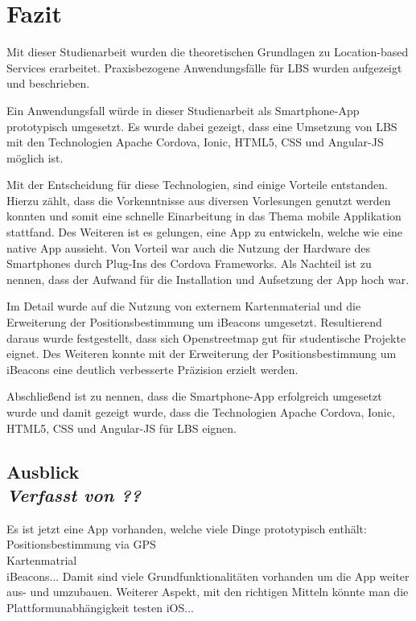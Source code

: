 \newpage
\section{Fazit}


Mit dieser Studienarbeit wurden die theoretischen Grundlagen zu Location-based Services erarbeitet. 
Praxisbezogene Anwendungsfälle für LBS wurden aufgezeigt und beschrieben.

Ein Anwendungsfall würde in dieser Studienarbeit als Smartphone-App prototypisch umgesetzt. 
Es wurde dabei gezeigt, dass eine Umsetzung von LBS mit den Technologien Apache Cordova, Ionic, HTML5, CSS und Angular-JS möglich ist. 

Mit der Entscheidung für diese Technologien, sind einige Vorteile entstanden. Hierzu zählt, dass die Vorkenntnisse aus diversen Vorlesungen genutzt werden konnten und somit eine schnelle Einarbeitung in das Thema mobile Applikation stattfand. Des Weiteren ist es gelungen, eine App zu entwickeln, welche wie eine native App aussieht. Von Vorteil war auch die Nutzung der Hardware des Smartphones durch Plug-Ins des Cordova Frameworks. Als Nachteil ist zu nennen, dass der Aufwand für die Installation und Aufsetzung der App hoch war.

Im Detail wurde auf die Nutzung von externem Kartenmaterial und die Erweiterung der Positionsbestimmung um iBeacons umgesetzt.
Resultierend daraus wurde festgestellt, dass sich Openstreetmap gut für studentische Projekte eignet. Des Weiteren konnte mit der Erweiterung der Positionsbestimmung um iBeacons eine deutlich verbesserte Präzision erzielt werden. 

Abschließend ist zu nennen, dass die Smartphone-App erfolgreich umgesetzt wurde und damit gezeigt wurde, dass die Technologien Apache Cordova, Ionic, HTML5, CSS und Angular-JS für LBS eignen.


\subsection[Ausblick]{Ausblick
 \\ \textnormal{\small{\textit {Verfasst von ??}}}}
 
Es ist jetzt eine App vorhanden, welche viele Dinge prototypisch enthält:
\\Positionsbestimmung via GPS
\\Kartenmatrial
\\iBeacons...
Damit sind viele Grundfunktionalitäten vorhanden um die App weiter aus- und umzubauen.
Weiterer Aspekt, mit den richtigen Mitteln könnte man die Plattformunabhängigkeit testen iOS...